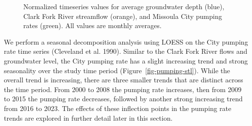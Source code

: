 \documentclass[
  letterpaper,
  DIV=11,
  numbers=noendperiod]{scrartcl}
\begin{document}
\begin{figure}


\caption{\label{fig-norm-ts}Normalized timeseries values for average
groundwater depth (blue), Clark Fork River streamflow (orange), and
Missoula City pumping rates (green). All values are monthly averages.}

\end{figure}%

We perform a seasonal decomposition analysis using LOESS on the City
pumping rate time series (Cleveland et al. 1990). Similar to the Clark
Fork River flows and groundwater level, the City pumping rate has a
slight increasing trend and strong seasonality over the study time
period (Figure~\ref{fig-pumping-stl}). While the overall trend is
increasing, there are three smaller trends that are distinct across the
time period. From 2000 to 2008 the pumping rate increases, then from
2009 to 2015 the pumping rate decreases, followed by another strong
increasing trend from 2016 to 2023. The effects of these inflection
points in the pumping rate trends are explored in further detail later
in this section.
\end{document}
